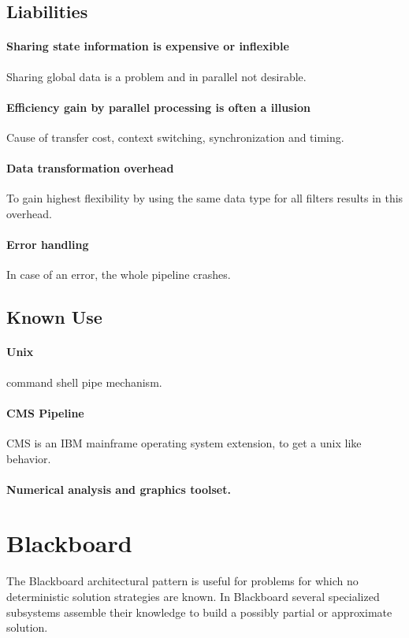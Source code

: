 \documentclass[a4paper,11pt,twocolumn]{report}
\begin{document}
    \subsection{Liabilities}
    \paragraph{Sharing state information is expensive or inflexible}
    Sharing global data is a problem and in parallel not desirable.
    \paragraph{Efficiency gain by parallel processing is often a illusion}
    Cause of transfer cost, context switching, synchronization and timing.
    \paragraph{Data transformation overhead}
    To gain highest flexibility by using the same data type for all filters
    results in this overhead.
    \paragraph{Error handling}
    In case of an error, the whole pipeline crashes.
    \subsection{Known Use}
    \paragraph{Unix} command shell pipe mechanism.
    \paragraph{CMS Pipeline} CMS is an IBM mainframe operating system 
    extension, to get a unix like behavior.
    \paragraph{Numerical analysis and graphics toolset.}


    \section{Blackboard}
    The Blackboard architectural pattern is useful for problems for which no
    deterministic solution strategies are known. In Blackboard several
    specialized subsystems assemble their knowledge to build a possibly partial
    or approximate solution.
\end{document}
